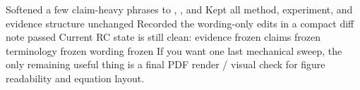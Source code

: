 {}\markdownRendererUlBeginTight
\markdownRendererUlItem Softened a few claim-heavy phrases to , , and \markdownRendererUlItemEnd 
\markdownRendererUlItem Kept all method, experiment, and evidence structure unchanged\markdownRendererUlItemEnd 
\markdownRendererUlItem Recorded the wording-only edits in a compact diff note\markdownRendererUlItemEnd 
\markdownRendererUlEndTight \markdownRendererInterblockSeparator
{}\markdownRendererInterblockSeparator
{}\markdownRendererUlBeginTight
\markdownRendererUlItem {} passed\markdownRendererUlItemEnd 
\markdownRendererUlEndTight \markdownRendererInterblockSeparator
{}Current RC state is still clean:\markdownRendererInterblockSeparator
{}\markdownRendererUlBeginTight
\markdownRendererUlItem evidence frozen\markdownRendererUlItemEnd 
\markdownRendererUlItem claims frozen\markdownRendererUlItemEnd 
\markdownRendererUlItem terminology frozen\markdownRendererUlItemEnd 
\markdownRendererUlItem wording frozen\markdownRendererUlItemEnd 
\markdownRendererUlEndTight \markdownRendererInterblockSeparator
{}If you want one last mechanical sweep, the only remaining useful thing is a final PDF render / visual check for figure readability and equation layout.
\markdownRendererSectionEnd 
\markdownRendererSectionEnd \markdownRendererDocumentEnd